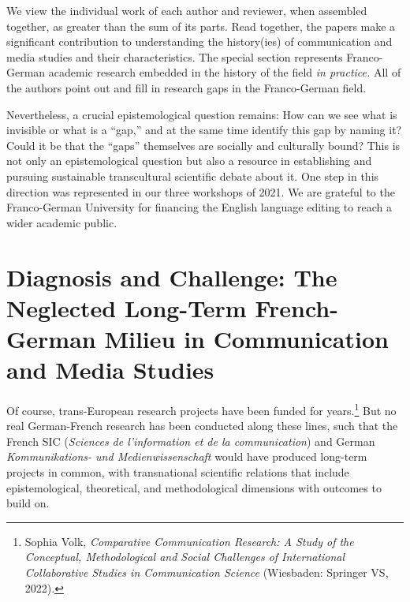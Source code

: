\documentclass{tufte-handout}
\begin{document}
We view the individual work of each author and reviewer, when assembled
together, as greater than the sum of its parts. Read together, the
papers make a significant contribution to understanding the history(ies)
of communication and media studies and their characteristics. The
special section represents Franco-German academic research embedded in
the history of the field \emph{in practice.} All of the authors point
out and fill in research gaps in the Franco-German field.

\newpage Nevertheless, a crucial epistemological question remains: How can we see
what is invisible or what is a ``gap,'' and at the same time identify
this gap by naming it? Could it be that the ``gaps'' themselves are
socially and culturally bound? This is not only an epistemological
question but also a resource in establishing and pursuing sustainable
transcultural scientific debate about it. One step in this direction was
represented in our three workshops of 2021. We are grateful to the
Franco-German University for financing the English language editing to
reach a wider academic public.

\hypertarget{diagnosis-and-challenge-the-neglected-long-term-french-german-milieu-in-communication-and-media-studies}{%
\section{Diagnosis and Challenge: The Neglected Long-Term
French-\\\noindent German Milieu in Communication and Media
Studies}\label{diagnosis-and-challenge-the-neglected-long-term-french-german-milieu-in-communication-and-media-studies}}

Of course, trans-European research projects have been funded for
years.\footnote{Sophia Volk, \emph{Comparative Communication Research: A
  Study of the Conceptual, Methodological and Social Challenges of
  International Collaborative Studies in Communication Science}
  (Wiesbaden: Springer VS, 2022).} But no real German-French research
has been conducted along these lines, such that the French SIC
(\emph{Sciences de l'information et de la communication}) and German
\emph{Kommunikations- und Medienwissenschaft} would have produced
long-term projects in common, with transnational scientific relations
that include epistemological, theoretical, and methodological dimensions
with outcomes to build on.
\end{document}
